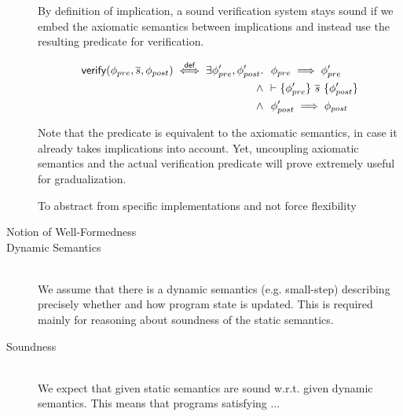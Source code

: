 \begin{description}
    By definition of implication, a sound verification system stays sound if we embed the axiomatic semantics between implications and instead use the resulting predicate for verification. %
    \begin{definition}
        \begin{align*}
        \textsf{verify}(\phi_{pre}, \overline{s}, \phi_{post}) \overset{\textsf{def}}{\iff} \exists \phi_{pre}', \phi_{post}'.
        &~~ \phi_{pre} \implies \phi_{pre}' \\
        \wedge& {~} \vdash \{{\phi_{pre}'}\} ~{\overline{s}}~ \{{\phi_{post}'}\} \\
        \wedge&~~ \phi_{post}' \implies \phi_{post}
        \end{align*}
    \end{definition}
    Note that the predicate is equivalent to the axiomatic semantics, in case it already takes implications into account.
    Yet, uncoupling axiomatic semantics and the actual verification predicate will prove extremely useful for gradualization.
    
    
    To abstract from specific implementations and not force flexibility 

\item[Notion of Well-Formedness]
    
    
    
\item[Dynamic Semantics]~\\
    We assume that there is a dynamic semantics (e.g. small-step) describing precisely whether and how program state is updated.
    This is required mainly for reasoning about soundness of the static semantics.
    
\item[Soundness]~\\
    We expect that given static semantics are sound w.r.t. given dynamic semantics.
    This means that programs satisfying ... 
\end{description}